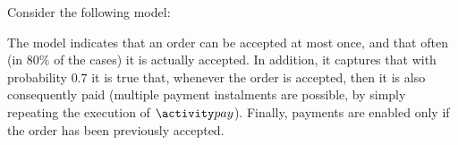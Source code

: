 \begin{example}
  \label{ex:prob-interplay}
  Consider the following \pdeclare model:
  \begin{center}
  \end{center}
  The model indicates that an order can be accepted at most once, and that often (in $80\%$ of the cases) it is actually accepted. In addition, it captures that with probability $0.7$ it is true that, whenever the order is accepted, then it is also consequently paid (multiple payment instalments are possible, by simply repeating the execution of $\pay$). Finally, payments are enabled only if the order has been previously accepted.


\end{example}
